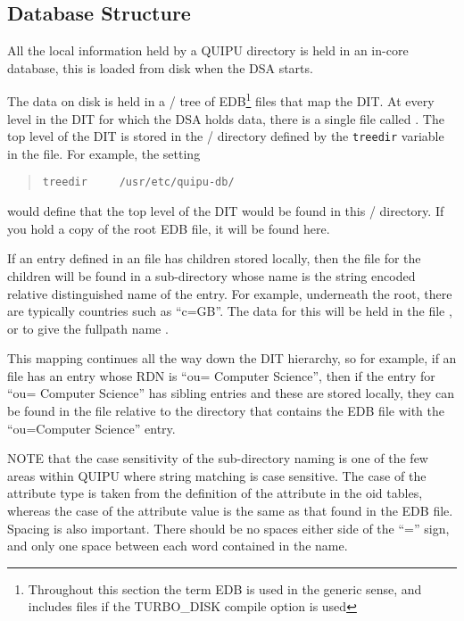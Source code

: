 \subsection {Database Structure}

All the local information held by a QUIPU directory is held in an in-core
database, this is loaded from disk when the DSA starts. 

The data on disk is held in a \unix/ tree of EDB\footnote{Throughout
this section the term EDB is used in the generic sense, and
includes  files if the TURBO\_DISK compile option is used}
files that map the DIT.
At every level in the DIT for which the DSA holds data, there is a single
file called .
The top level of the DIT is stored in the \unix/ directory defined by
the \verb+treedir+ variable in the  file.
For example, the setting
\begin{quote}\small\begin{verbatim}
treedir     /usr/etc/quipu-db/
\end{verbatim}\end{quote}
would define that the top level of the DIT would be found in this
\unix/ directory.
If you hold a copy of the root EDB file, it will be found here.

If an entry defined in an  file has
children stored locally, then the  file for the children 
will be found in a
sub-directory whose name is the string encoded relative
distinguished name of the entry.
For example, underneath the root, there are typically countries such
as ``c=GB''.  The data for this will be held in the file
, or to give the fullpath name
.

This mapping continues all the way down the DIT hierarchy, so for example, if an  file has an entry whose RDN is
``ou= Computer Science'', then if the entry for
``ou= Computer Science'' has sibling entries and these are stored locally,
they can be found in the file  
relative to the directory that contains the EDB file with the
``ou=Computer Science'' entry.

NOTE that the case sensitivity of the sub-directory naming is one of the
few areas within QUIPU where string matching is case sensitive.
The case of the attribute type is taken from the definition of the attribute
in the oid tables, whereas the case of the attribute value is the same as
that found in the EDB file.
Spacing is also important.  There should be no spaces either side of
the ``='' sign, and only one space between each word contained in the name.

